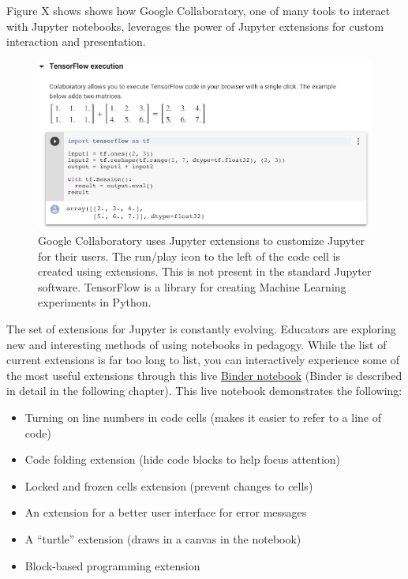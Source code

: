 \documentclass[]{book}
\providecommand{\tightlist}{%
  \setlength{\itemsep}{0pt}\setlength{\parskip}{0pt}}
\begin{document}
Figure X shows shows how Google Collaboratory, one of many tools to
interact with Jupyter notebooks, leverages the power of Jupyter
extensions for custom interaction and presentation.

\begin{figure}
\centering
\includegraphics{images/chapter53.png}
\caption{Google Collaboratory uses Jupyter extensions to customize Jupyter for their users. The run/play icon to the left of the code cell is created using extensions. This is not present in the standard Jupyter software. TensorFlow is a library for creating Machine Learning experiments in Python.}
\end{figure}

The set of extensions for Jupyter is constantly evolving. Educators
are exploring new and interesting methods of using notebooks in
pedagogy. While the list of current extensions is far too long to
list, you can interactively experience some of the most useful
extensions through this live
\href{https://hub.mybinder.org/user/psychemedia-showntell-eii7j2nh/notebooks/index_computing.ipynb}{Binder notebook}
(Binder is described in detail in the following chapter).
This live notebook demonstrates the following:

\begin{itemize}
\tightlist
\item
  Turning on line numbers in code cells (makes it easier to refer to a line of code)
\item
  Code folding extension (hide code blocks to help focus attention)
\item
  Locked and frozen cells extension (prevent changes to cells)
\item
  An extension for a better user interface for error messages
\item
  A ``turtle'' extension (draws in a canvas in the notebook)
\item
  Block-based programming extension
\end{itemize}
\end{document}
